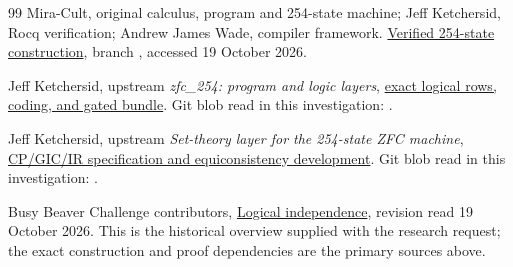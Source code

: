 \begin{thebibliography}{99}
Mira-Cult, original calculus, program and 254-state machine;
Jeff Ketchersid, Rocq verification;
Andrew James Wade, compiler framework.
\href{https://github.com/jeff87654/busy-beaver/tree/zf-254/ZF/m254}{Verified 254-state construction}, branch , accessed 19 October 2026.

Jeff Ketchersid, upstream \emph{zfc\_254: program and logic layers},
\href{https://github.com/jeff87654/busy-beaver/blob/zf-254/ZF/m254/design/logic.md}{exact logical rows, coding, and gated bundle}.
Git blob read in this investigation:
.

Jeff Ketchersid, upstream \emph{Set-theory layer for the 254-state ZFC machine},
\href{https://github.com/jeff87654/busy-beaver/blob/zf-254/ZF/m254/design/settheory.md}{CP/GIC/IR specification and equiconsistency development}.
Git blob read in this investigation:
.

Busy Beaver Challenge contributors,
\href{https://wiki.bbchallenge.org/wiki/Logical_independence}{Logical independence},
revision read 19 October 2026. This is the historical overview supplied
with the research request; the exact construction and proof dependencies
are the primary sources above.
\end{thebibliography}
